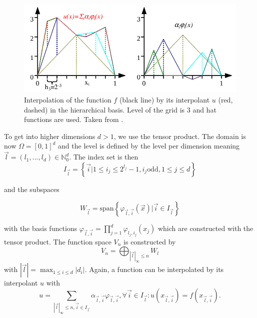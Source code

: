 \begin{figure}[ht]
	\centering
	\includegraphics[scale=0.5]{figures/weighted_sum_hierarchical.png}
	\caption{ Interpolation of the function $ f $ (black line) by its interpolant $ u $ (red, dashed) in the hierarchical basis. Level of the grid is 3 and hat functions are used. Taken from \cite{pfluger2010spatially}.}
	\label{fig:weighted_sum_hierarchical}
\end{figure}

To get into higher dimensions $ d > 1 $, we use the tensor product. The domain is now $ \Omega = [0,1]^d $ and the level is defined by the level per dimension meaning $ \vec{l} = (l_1, ..., l_d) \in \mathbb{N}_0^d $. The index set is then
\begin{equation}
	I_{\vec{l}} = \left\{ \vec{i} | 1 \le i_j \le 2^{l_j} -1 , i_j \text{odd}, 1 \le j \le d \right\}
\end{equation}

and the subspaces 

\begin{equation}
	W_{\vec{l}} = \text{span}\left\{ \varphi_{\vec{l},\vec{i}}( \vec{x} ) | \vec{i} \in I_{\vec{l}}\right\}
\end{equation}

with the basis functions $ \varphi_{\vec{l},\vec{i}} = \prod_{j=1}^{d} \varphi_{l_j,i_j}(x_j) $ which are constructed with the tensor product. The function space $ V_n $ is constructed by
\begin{equation}
	V_n = \bigoplus_{\left|\vec{l}\right|_\infty \le n} W_l
\end{equation}
with $ \left|\vec{l}\right| = \max_{1 \le i \le d} \left|d_i\right| $. Again, a function can be interpolated by its interpolant $ u $ with
\begin{equation}
	u = \sum_{\left|\vec{l}\right|_\infty \le n, \vec{i} \in I_{\vec{l}}}\alpha_{\vec{l},\vec{i}} \varphi_{\vec{l},\vec{i}}, \forall \vec{i} \in I_{\vec{l}}: u\left(x_{\vec{l},\vec{i}}\right) = f\left(x_{\vec{l},\vec{i}}\right).
\end{equation}

